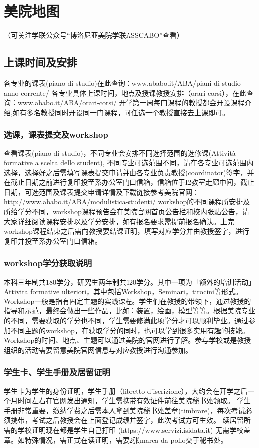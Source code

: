 \section{美院地图}
（可关注学联公众号“博洛尼亚美院学联ASSCABO”查看）
\subsection{上课时间及安排}
各专业的课表(piano di studio)在此查询：www.ababo.it/ABA/piani-di-studio-anno-corrente/ 
各专业具体上课时间，地点及授课教授安排（orari corsi），在此查询：www.ababo.it/ABA/orari-corsi/
开学第一周每门课程的教授都会开设课程介绍,如有多名教授同时开设同一门课程，可任选一个教授直接去上课即可。
\subsubsection{选课，课表提交及workshop}
查看课表(piano di studio)，不同专业会安排不同选择范围的选修课(Attività formative a scelta dello student), 不同专业可选范围不同，请在各专业可选范围内选择，选择好之后需填写课表提交申请并由各专业负责教授(coordinator)签字，并在截止日期之前进行复印投至系办公室门口信箱，信箱位于I2教室走廊中间，截止日期，可选范围及课表提交申请详情及下载链接参考美院官网：http://www.ababo.it/ABA/modulistica-studenti/
workshop的不同课程所安排及所给学分不同，workshop课程预告会在美院官网首页公告栏和校内张贴公告，请大家详细阅读课程安排以及学分安排，如有报名要求需提前报名确认。上完workshop课程结束之后需向教授要结课证明，填写对应学分并由教授签字，进行复印并投至系办公室门口信箱。
\subsubsection{workshop学分获取说明}
本科三年制共180学分，研究生两年制共120学分。其中一项为「额外的培训活动」Attivita formative ulteriori，其中包括Workshop，Seminari，tirocini等形式。
Workshop一般是指有固定主题的实践课程。学生们在教授的带领下，通过教授的指导和示范，最终会做出一些作品，比如：装置，绘画，模型等等。根据美院专业的不同，需要获取的学分也不同，学生需要修满此项学分才可以顺利毕业。通过参加不同主题的workshop，在获取学分的同时，也可以学到很多实用有趣的技能。
Workshop的时间、地点、主题可以通过美院的官网进行了解。参与学校或是教授组织的活动需要留意美院官网信息与对应教授进行沟通参加。
\subsubsection{学生卡、学生手册及居留证明}
学生卡为学生的身份证明，学生手册（libretto d’iscrizione），大约会在开学之后一个月时间左右在官网发出通知，学生需携带有效证件前往美院秘书处领取。
学生手册非常重要，缴纳学费之后需本人拿到美院秘书处盖章(timbrare)，每次考试必须携带，考试之后教授会在上面登记成绩并签字，此次考试方可生效。
续居留所需的学校证明现在都是学生自己打印 (https://www.servizi.isidata.it) 无需学校盖章。如特殊情况，需正式在读证明，需要2张marca da pollo交于秘书处。
